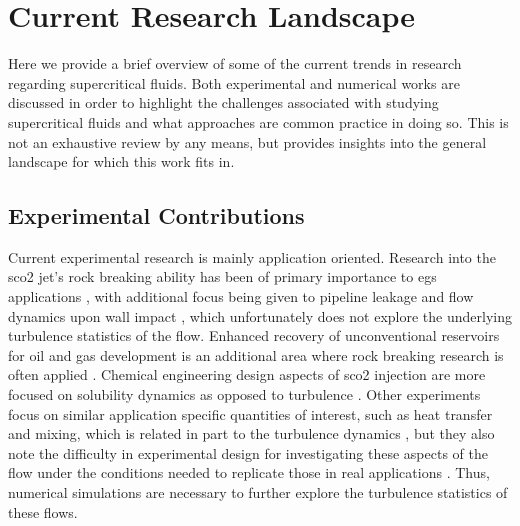 
\section{Current Research Landscape}
Here we provide a brief overview of some of the current trends in research regarding supercritical fluids. Both experimental and numerical works are discussed in order to highlight the challenges associated with studying supercritical fluids and what approaches are common practice in doing so. This is not an exhaustive review by any means, but provides insights into the general landscape for which this work fits in. 
\subsection{Experimental Contributions}
Current experimental research is mainly application oriented. Research into the \gls{sco2} jet's rock breaking ability has been of primary importance to \gls{egs} applications \cite{EGScomp, EGS2, very_rock, experiment, rb}, with additional focus being given to pipeline leakage and flow dynamics upon wall impact \cite{WANG2015210, WANG201977}, which unfortunately does not explore the underlying turbulence statistics of the flow. Enhanced recovery of unconventional reservoirs for oil and gas development is an additional area where rock breaking research is often applied \cite{HUANG2020106735, HUANG2019}. Chemical engineering design aspects of \gls{sco2} injection are more focused on solubility dynamics as opposed to turbulence \cite{freejet, pulse_jet}. Other experiments focus on similar application specific quantities of interest, such as heat transfer and mixing, which is related in part to the turbulence dynamics \cite{heated_cyl, 10.1115/FEDSM2022-87029}, but they also note the difficulty in experimental design for investigating these aspects of the flow under the conditions needed to replicate those in real applications \cite{freejet}. Thus, numerical simulations are necessary to further explore the turbulence statistics of these flows.

